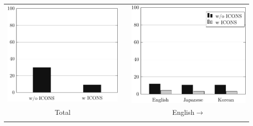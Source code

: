 \documentclass[a4paper]{article}
\begin{document}
\begin{tabular}[t]{ccc}
\includegraphics{avr-total.pdf} & \xspace & \includegraphics{avr-eng.pdf} \\
Total & & English\ensuremath{\rightarrow}\\
& &  \xspace \\ 

\end{tabular}
\end{document}
